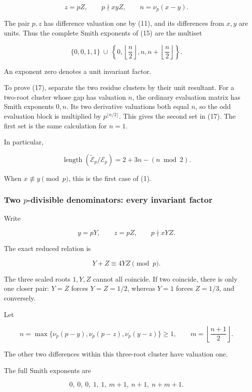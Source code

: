 \[
z=pZ,\qquad p\nmid xyZ,\qquad n=\nu_p(x-y).
\]

The pair \(p,z\) has difference valuation one by (11), and its
differences from \(x,y\) are units. Thus the complete Smith exponents of
(15) are the multiset

\[
\boxed{
\{0,0,1,1\}
\ \cup\
\left\{
0,\left\lfloor\frac n2\right\rfloor,
n,n+\left\lfloor\frac n2\right\rfloor
\right\}.
}
\tag{17}
\]

An exponent zero denotes a unit invariant factor.

To prove (17), separate the two residue clusters by their unit
resultant. For a two-root cluster whose gap has valuation \(n\), the
ordinary evaluation matrix has Smith exponents \(0,n\). Its two
derivative valuations both equal \(n\), so the odd evaluation block is
multiplied by \(p^{\lfloor n/2\rfloor}\). This gives the second set in
(17). The first set is the same calculation for \(n=1\).

In particular,

\[
\boxed{
\operatorname{length}
(\widetilde{\mathscr E}_p/\mathscr E_p)
=2+3n-(n\bmod2).
}
\tag{18}
\]

When \(x\not\equiv y\pmod p\), this is the first case of (1).

\subsubsection{\texorpdfstring{Two \(p\)-divisible denominators: every
invariant
factor}{Two p-divisible denominators: every invariant factor}}\label{two-p-divisible-denominators-every-invariant-factor}

Write

\[
y=pY,\qquad z=pZ,\qquad p\nmid xYZ.
\]

The exact reduced relation is

\[
Y+Z\equiv4YZ\pmod p.
\tag{19}
\]

The three scaled roots \(1,Y,Z\) cannot all coincide. If two coincide,
there is only one closer pair: \(Y=Z\) forces \(Y=Z=1/2\), whereas
\(Y=1\) forces \(Z=1/3\), and conversely.

Let

\[
n=\max\{\nu_p(p-y),\nu_p(p-z),\nu_p(y-z)\}\ge1,
\qquad
m=\left\lfloor\frac{n+1}{2}\right\rfloor.
\]

The other two differences within this three-root cluster have valuation
one.

The full Smith exponents are

\[
\boxed{
0,\ 0,\ 0,\ 1,\ 1,\ m+1,\ n+1,\ n+m+1.
}
\tag{20}
\]

